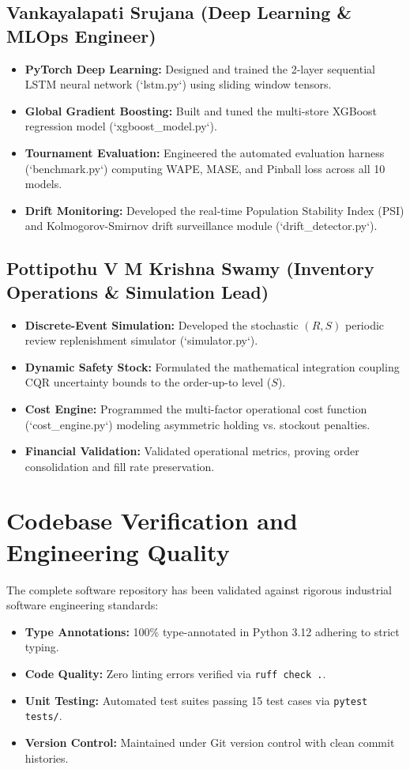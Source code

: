 \documentclass[12pt,a4paper,oneside]{report}
\theoremstyle{definition}
\begin{document}
\subsection{Vankayalapati Srujana (Deep Learning \& MLOps Engineer)}
\begin{itemize}[itemsep=0.15cm]
    \item \textbf{PyTorch Deep Learning:} Designed and trained the 2-layer sequential LSTM neural network (`lstm.py`) using sliding window tensors.
    \item \textbf{Global Gradient Boosting:} Built and tuned the multi-store XGBoost regression model (`xgboost_model.py`).
    \item \textbf{Tournament Evaluation:} Engineered the automated evaluation harness (`benchmark.py`) computing WAPE, MASE, and Pinball loss across all 10 models.
    \item \textbf{Drift Monitoring:} Developed the real-time Population Stability Index (PSI) and Kolmogorov-Smirnov drift surveillance module (`drift_detector.py`).
\end{itemize}

\subsection{Pottipothu V M Krishna Swamy (Inventory Operations & Simulation Lead)}
\begin{itemize}[itemsep=0.15cm]
    \item \textbf{Discrete-Event Simulation:} Developed the stochastic $(R, S)$ periodic review replenishment simulator (`simulator.py`).
    \item \textbf{Dynamic Safety Stock:} Formulated the mathematical integration coupling CQR uncertainty bounds to the order-up-to level ($S$).
    \item \textbf{Cost Engine:} Programmed the multi-factor operational cost function (`cost_engine.py`) modeling asymmetric holding vs. stockout penalties.
    \item \textbf{Financial Validation:} Validated operational metrics, proving order consolidation and fill rate preservation.
\end{itemize}

\section{Codebase Verification and Engineering Quality}
The complete software repository has been validated against rigorous industrial software engineering standards:
\begin{itemize}[itemsep=0.15cm]
    \item \textbf{Type Annotations:} 100\% type-annotated in Python 3.12 adhering to strict typing.
    \item \textbf{Code Quality:} Zero linting errors verified via \texttt{ruff check .}.
    \item \textbf{Unit Testing:} Automated test suites passing 15 test cases via \texttt{pytest tests/}.
    \item \textbf{Version Control:} Maintained under Git version control with clean commit histories.
\end{itemize}
\end{document}
